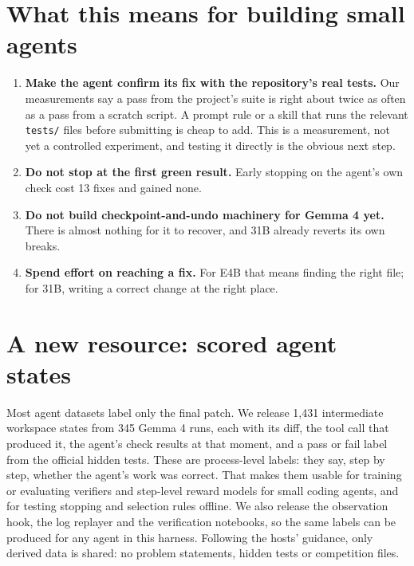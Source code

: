 \documentclass[10pt]{article}
\begin{document}
\section*{What this means for building small agents}
\begin{enumerate}\setlength\itemsep{2pt}\item \textbf{Make the agent confirm its fix with the repository's real tests.} Our measurements say a pass from the project's suite is right about twice as often as a pass from a scratch script. A prompt rule or a skill that runs the relevant \texttt{tests/} files before submitting is cheap to add. This is a measurement, not yet a controlled experiment, and testing it directly is the obvious next step.\item \textbf{Do not stop at the first green result.} Early stopping on the agent's own check cost 13 fixes and gained none.\item \textbf{Do not build checkpoint-and-undo machinery for Gemma 4 yet.} There is almost nothing for it to recover, and 31B already reverts its own breaks.\item \textbf{Spend effort on reaching a fix.} For E4B that means finding the right file; for 31B, writing a correct change at the right place.\end{enumerate}
\section*{A new resource: scored agent states}
Most agent datasets label only the final patch. We release 1,431 intermediate workspace states from 345 Gemma 4 runs, each with its diff, the tool call that produced it, the agent's check results at that moment, and a pass or fail label from the official hidden tests. These are process-level labels: they say, step by step, whether the agent's work was correct. That makes them usable for training or evaluating verifiers and step-level reward models for small coding agents, and for testing stopping and selection rules offline. We also release the observation hook, the log replayer and the verification notebooks, so the same labels can be produced for any agent in this harness. Following the hosts' guidance, only derived data is shared: no problem statements, hidden tests or competition files.
\end{document}
